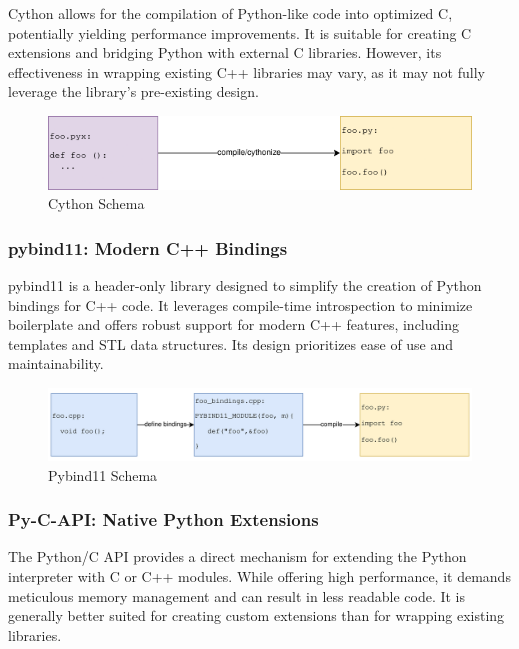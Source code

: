 Cython allows for the compilation of Python-like code into optimized C, potentially yielding performance improvements. It is suitable for creating C extensions and bridging Python with external C libraries. However, its effectiveness in wrapping existing C++ libraries may vary, as it may not fully leverage the library's pre-existing design. \cite{cython-docu}

\begin{figure}[htpb]
    \centering
    \includegraphics[width=\textwidth]{figures/cython_schema.png}
    \caption{Cython Schema}
    \label{fig:cython-schema}
\end{figure}

\subsubsection{pybind11: Modern C++ Bindings}

pybind11 is a header-only library designed to simplify the creation of Python bindings for C++ code. It leverages compile-time introspection to minimize boilerplate and offers robust support for modern C++ features, including templates and \ac{STL} data structures. Its design prioritizes ease of use and maintainability. \cite {pybind11-docu}

\begin{figure}[htpb]
    \centering
    \includegraphics[width=\textwidth]{figures/pybind_schema.png}
    \caption{Pybind11 Schema}
    \label{fig:pybind11-schema}
\end{figure}

\subsubsection{Py-C-API: Native Python Extensions}

The Python/C API provides a direct mechanism for extending the Python interpreter with C or C++ modules. While offering high performance, it demands meticulous memory management and can result in less readable code. It is generally better suited for creating custom extensions than for wrapping existing libraries. \cite{py-c-api}

